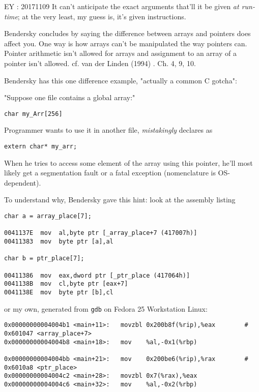 \documentclass[10pt]{amsart}
\begin{document}
\begin{multicols*}{2}
EY : 20171109 It can't anticipate the exact arguments that'll it be given \emph{at run-time}; at the very least, my guess is, it's given instructions.  

Bendersky \cite{Bend} concludes by saying the difference between arrays and pointers does affect you.  One way is how arrays can't be manipulated the way pointers can.  Pointer arithmetic isn't allowed for arrays and assignment to an array of a pointer isn't allowed.  cf. van der Linden (1994) \cite{Vand1994}. Ch. 4, 9, 10.  

Bendersky \cite{Bend} has this one difference example, "actually a common C gotcha":  

"Suppose one file contains a global array:"  

\begin{lstlisting}
char my_Arr[256]  
\end{lstlisting}

Programmer wants to use it in another file, \emph{mistakingly} declares as  
\begin{lstlisting}
extern char* my_arr; 
\end{lstlisting}

When he tries to access some element of the array using this pointer, he'll most likely get a segmentation fault or a fatal exception (nomenclature is OS-dependent).  

To understand why, Bendersky \cite{Bend} gave this hint:  look at the assembly listing  

\begin{lstlisting}
char a = array_place[7];

0041137E  mov  al,byte ptr [_array_place+7 (417007h)]
00411383  mov  byte ptr [a],al

char b = ptr_place[7];

00411386  mov  eax,dword ptr [_ptr_place (417064h)]
0041138B  mov  cl,byte ptr [eax+7]
0041138E  mov  byte ptr [b],cl
\end{lstlisting}

or my own, generated from \verb|gdb| on Fedora 25 Workstation Linux:

\begin{lstlisting}
0x00000000004004b1 <main+11>:	movzbl 0x200b8f(%rip),%eax        # 0x601047 <array_place+7>
0x00000000004004b8 <main+18>:	mov    %al,-0x1(%rbp)

0x00000000004004bb <main+21>:	mov    0x200be6(%rip),%rax        # 0x6010a8 <ptr_place>
0x00000000004004c2 <main+28>:	movzbl 0x7(%rax),%eax
0x00000000004004c6 <main+32>:	mov    %al,-0x2(%rbp)
\end{lstlisting}


\end{multicols*}
\end{document}
